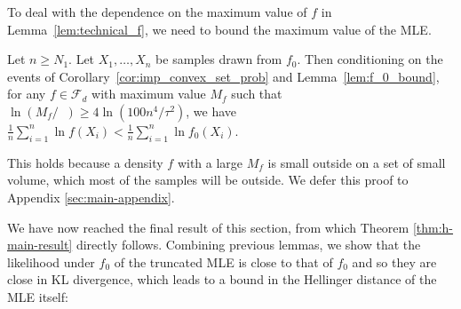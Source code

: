 \documentclass[final,12pt]{colt2018}
\newcommand{\new}[1]{{\color{red} #1}}
\newcommand{\new}[1]{{#1}}
\newtheorem{informal theorem}[theorem]{Theorem (informal statement)}
\newcommand{\pmin}{\mathop{p_{\mathrm{min}}}}
\begin{document}
To deal with the dependence on the maximum value of $f$ in Lemma~\ref{lem:technical_f}, 
we need to bound  {the maximum value of the MLE}.

\begin{lemma}\label{lem:mle_mf}
Let $n \geq N_1$.
Let $X_1, \ldots, X_n$ be samples drawn from $f_0$.
Then \new{conditioning on the events of Corollary~\ref{cor:imp_convex_set_prob} and Lemma~\ref{lem:f_0_bound}}, 
for any $f \in \mathcal{F}_d$ with maximum value $M_f$ such that 
$\ln (M_f/\pmin) \geq  {4\ln(100 n^4/\tau^2)}$, we have
$
\frac{1}{n} \sum_{i=1}^n \ln f(X_i) < \frac{1}{n} \sum_{i=1}^n \ln f_0(X_i).
$
\end{lemma}
This holds because a density $f$ with a large $M_f$ is small outside on a set of small volume, which most of the samples will be outside. We defer this proof to Appendix \ref{sec:main-appendix}.

We have now reached the final result of this section, from which Theorem \ref{thm:h-main-result} directly follows.
Combining previous  {lemmas}, we show that the likelihood under $f_0$ of the truncated 
MLE is close to that of $f_0$ and so they are close in KL divergence, 
which leads to a bound in the Hellinger distance of the MLE itself:
\end{document}
